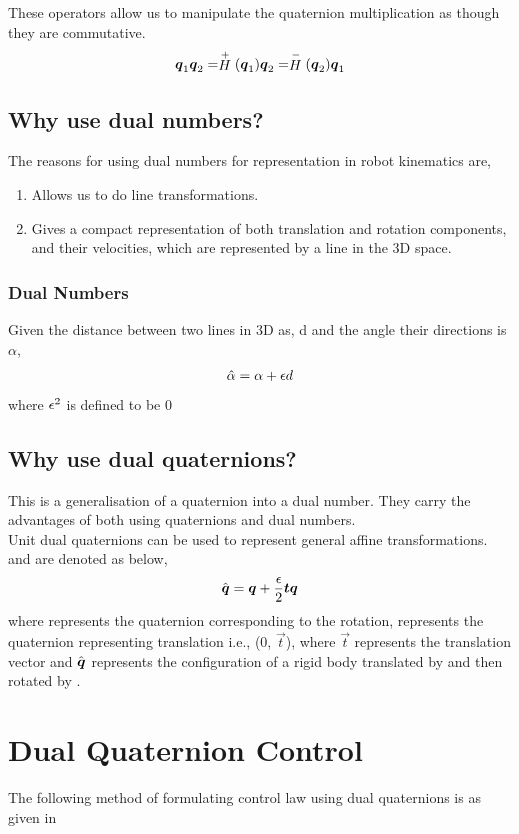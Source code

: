 \documentclass[a4paper,12pt]{article}
\newcommand{\Hp}{\ensuremath{\stackrel{+}{H}}\xspace}
\newcommand{\Hn}{\ensuremath{\stackrel{-}{H}}\xspace}
\begin{document}
These operators allow us to manipulate the quaternion multiplication as though they are commutative.
\begin{align}
	\bq_1\bq_2 = \Hp(\bq_1) \bq_2 = \Hn(\bq_2) \bq_1 \label{hamilt}
\end{align}

\subsection{Why use dual numbers?}
The reasons for using dual numbers for representation in robot kinematics are, 
\begin{enumerate}
	\item Allows us to do line transformations.
	\item Gives a compact representation of both translation and rotation components, and their velocities, which are represented by a line in the 3D space.
\end{enumerate}
\subsubsection{Dual Numbers}
Given the distance between two lines in 3D as, d and the angle their directions is $\alpha$, 
\begin{align}
	\hat{\alpha} = \alpha + \epsilon d
\end{align}
where $\epsilon^2$ is defined to be 0

\subsection{Why use dual quaternions?}
This is a generalisation of a quaternion into a dual number. They carry the advantages of both using quaternions and dual numbers. \\
Unit dual quaternions can be used to represent general affine transformations. and are denoted as below,
\begin{align}
	\hat{\boldsymbol{q}} = \boldsymbol{q}+\frac{\epsilon}{2}\boldsymbol{t} \boldsymbol{q}
\end{align}
where \bq represents the quaternion corresponding to the rotation, \bt represents the quaternion representing translation i.e., (0, $\vec{t}$), where $\vec{t}$ represents the translation vector and $\hat{\boldsymbol{q}}$ represents the configuration of a rigid body translated by \bt and then rotated by \bq.

\section{Dual Quaternion Control}
The following method of formulating control law using dual quaternions is as given in \cite{pham2010position}
\end{document}
